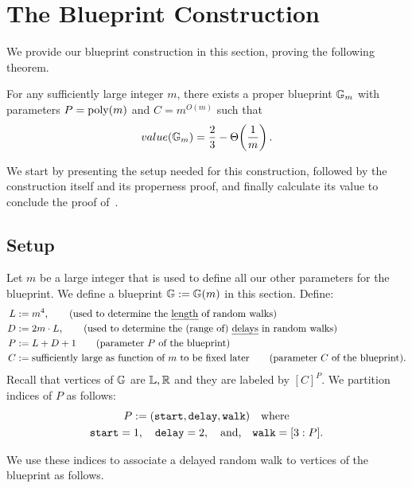 




\section{The Blueprint Construction}\label{sec:construct-blueprint}

We provide our blueprint construction in this section, proving the following theorem. 
\begin{theorem*}
	For any sufficiently large integer $m$, there exists a proper blueprint $\mathbb{G}_m$ with parameters $P=\mbox{\rm poly}(m)$ and $C=m^{O(m)}$ such that 
	\[
		value(\mathbb{G}_m) = \frac{2}{3} - \Theta\!\left(\frac{1}{m}\right). 
	\]
\end{theorem*}

We start by presenting the setup needed for this construction, followed by the construction itself and its properness proof, and finally calculate its value to conclude the proof of~. 

\subsection{Setup} 
Let $m$ be a large integer that is used to define all our other parameters for the blueprint. We define a blueprint $\mathbb{G} := \mathbb{G}(m)$ in this section. 
Define: 
\begin{align*}
L &:= m^4, \tag{used to determine the \emph{length} of random walks} \\
D &:= 2m \cdot L, \tag{used to determine the (range of) \emph{delays} in random walks} \\
P &:= L+D+1 \tag{parameter $P$ of the blueprint} \\
C &:= \text{sufficiently large as function of $m$ to be fixed later} \tag{parameter $C$ of the blueprint}. 
\end{align*}
Recall that vertices of $\mathbb{G}$ are $\mathbb{L},\mathbb{R}$ and they are labeled by $[C]^{P}$. We partition indices of $P$ as follows: 
\begin{gather*}
	P := (\textnormal{\texttt{start}} , \textnormal{\texttt{delay}} , \textnormal{\texttt{walk}}) \quad \text{where} \\ 
	\textnormal{\texttt{start}}=1, \quad \textnormal{\texttt{delay}}=2, \quad \text{and,} \quad {\ensuremath{\textnormal{\texttt{walk}}}} = [3: P]. 
\end{gather*}

We use these indices to associate a delayed random walk to vertices of the blueprint as follows. 

